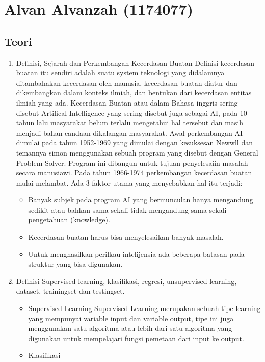 \section{Alvan Alvanzah (1174077)}

\subsection{Teori}
\begin{enumerate}
	\item Definisi, Sejarah dan Perkembangan Kecerdasan Buatan
	\hfill\break
	Definisi kecerdasan buatan itu sendiri adalah suatu system teknologi yang didalamnya ditambahakan kecerdasan oleh manusia, kecerdasan buatan diatur dan dikembangkan dalam konteks ilmiah, dan bentukan dari kecerdasan entitas ilmiah yang ada. Kecerdasan Buatan atau dalam Bahasa inggris sering disebut Artifical Intelligence yang sering disebut juga sebagai AI, pada 10 tahun lalu masyarakat belum terlalu mengetahui hal tersebut dan masih menjadi bahan candaan dikalangan masyarakat. Awal perkembangan AI dimulai pada tahun 1952-1969 yang dimulai dengan kesuksesan Newwll dan temannya simon menggunakan sebuah program yang disebut dengan General Problem Solver. Program ini dibangun untuk tujuan penyelesaiin masalah secara manusiawi. Pada tahun 1966-1974 perkembangan kecerdasan buatan mulai melambat. Ada 3 faktor utama yang menyebabkan hal itu terjadi:
	\begin{itemize}
		\item Banyak subjek pada program AI yang bermunculan hanya mengandung sedikit atau bahkan sama sekali tidak  mengandung sama sekali pengetahuan (knowledge).
		\item Kecerdasan buatan harus bisa menyelesaikan banyak masalah.
		\item Untuk menghasilkan perilkau intelijensia ada beberapa batasan pada struktur yang bisa digunakan.
	\end{itemize}
	\item Definisi
	\hfill\break
	Supervised learning, klasifikasi, regresi, unsupervised learning, dataset, trainingset dan testingset.
	\begin{itemize}
		\item Supervised Learning
		\hfill\break
		Supervised Learning merupakan sebuah tipe learning yang mempunyai variable input dan variable output, tipe ini juga menggunakan satu algoritma atau lebih dari satu algoritma yang digunakan untuk mempelajari fungsi  pemetaan dari input ke output.
		\item Klasifikasi

\end{itemize}
\end{enumerate}
